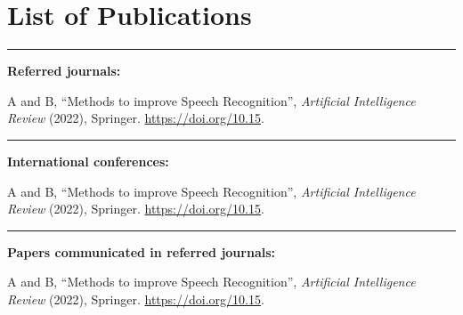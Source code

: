 \chapter*{List of Publications} \label{publications}
\noindent\rule{\linewidth}{2pt}
\textbf{{\large Referred journals:}}
\begin{enumerate}[label=\textbf{[\arabic*]}]
\item A and B, ``Methods to improve Speech Recognition'',
\emph{Artificial Intelligence Review} (2022), Springer.
\url{https://doi.org/10.15}.

\end{enumerate}
\noindent\rule{\linewidth}{0.2pt}
\textbf{{\large International conferences:}}
\begin{enumerate}[label=\textbf{[\arabic*]}]
\item A and B, ``Methods to improve Speech Recognition'',
\emph{Artificial Intelligence Review} (2022), Springer.
\url{https://doi.org/10.15}.

\end{enumerate}
\noindent\rule{\linewidth}{0.2pt}
\textbf{{\large Papers communicated in referred journals:}}
\begin{enumerate}[label=\textbf{[\arabic*]}]
\item A and B, ``Methods to improve Speech Recognition'',
\emph{Artificial Intelligence Review} (2022), Springer.
\url{https://doi.org/10.15}.
\end{enumerate}